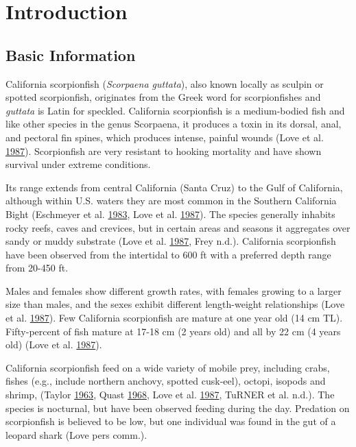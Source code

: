 \documentclass[12pt,]{article}
\begin{document}
\FloatBarrier

\newpage

\renewcommand{\thefigure}{\arabic{figure}}
\renewcommand{\thetable}{\arabic{table}}

\setcounter{figure}{0} \setcounter{table}{0}

\section{Introduction}\label{introduction}

\subsection{Basic Information}\label{basic-information}

California scorpionfish (\emph{Scorpaena guttata}), also known locally
as sculpin or spotted scorpionfish, originates from the Greek word for
scorpionfishes and \emph{guttata} is Latin for speckled. California
scorpionfish is a medium-bodied fish and like other species in the genus
Scorpaena, it produces a toxin in its dorsal, anal, and pectoral fin
spines, which produces intense, painful wounds (Love et al.
\protect\hyperlink{ref-Love1987}{1987}). Scorpionfish are very resistant
to hooking mortality and have shown survival under extreme conditions.

Its range extends from central California (Santa Cruz) to the Gulf of
California, although within U.S. waters they are most common in the
Southern California Bight (Eschmeyer et al.
\protect\hyperlink{ref-Eschmeyer1983}{1983}, Love et al.
\protect\hyperlink{ref-Love1987}{1987}). The species generally inhabits
rocky reefs, caves and crevices, but in certain areas and seasons it
aggregates over sandy or muddy substrate (Love et al.
\protect\hyperlink{ref-Love1987}{1987}, Frey n.d.). California
scorpionfish have been observed from the intertidal to 600 ft with a
preferred depth range from 20-450 ft.

Males and females show different growth rates, with females growing to a
larger size than males, and the sexes exhibit different length-weight
relationships (Love et al. \protect\hyperlink{ref-Love1987}{1987}). Few
California scorpionfish are mature at one year old (14 cm TL).
Fifty-percent of fish mature at 17-18 cm (2 years old) and all by 22 cm
(4 years old) (Love et al. \protect\hyperlink{ref-Love1987}{1987}).

California scorpionfish feed on a wide variety of mobile prey, including
crabs, fishes (e.g., include northern anchovy, spotted cusk-eel),
octopi, isopods and shrimp, (Taylor
\protect\hyperlink{ref-Taylor1963}{1963}, Quast
\protect\hyperlink{ref-Quast1968}{1968}, Love et al.
\protect\hyperlink{ref-Love1987}{1987}, TuRNER et al. n.d.). The species
is nocturnal, but have been observed feeding during the day. Predation
on scorpionfish is believed to be low, but one individual was found in
the gut of a leopard shark (Love pers comm.).
\end{document}
